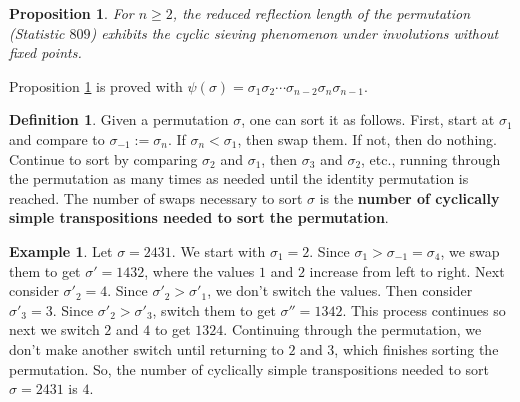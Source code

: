 \documentclass{amsart}
\newtheorem{prop}[thm]{Proposition}
\theoremstyle{definition}
\newtheorem{definition}[thm]{Definition}
\newtheorem{example}[thm]{Example}
\begin{document}
\begin{prop}\label{red_ref_len}
  For $n \geq 2$, the reduced reflection length of the permutation (Statistic $809$) exhibits the cyclic sieving phenomenon under involutions without fixed points.
\end{prop}


Proposition \ref{red_ref_len} is proved with $\psi(\sigma) = \sigma_1\sigma_2\dotsm \sigma_{n-2}\sigma_{n}\sigma_{n-1}$. 

\begin{definition}
  Given a permutation $\sigma$, one can sort it as follows. First, start at $\sigma_1$ and compare to $\sigma_{-1} := \sigma_n$. If $\sigma_n < \sigma_{1}$, then swap them. If not, then do nothing. Continue to sort by comparing $\sigma_2$ and $\sigma_1$, then $\sigma_3$ and $\sigma_2$, etc., running through the permutation as many times as needed until the identity permutation is reached. The number of swaps necessary to sort $\sigma$ is the \textbf{number of cyclically simple transpositions needed to sort the permutation}.
\end{definition}


\begin{example}
  Let $\sigma = 2 4 3 1$. We start with $\sigma_1 = 2$. Since $\sigma_1 > \sigma_{-1} = \sigma_4$, we swap them to get $\sigma' = 1 4 3 2$, where the values $1$ and $2$ increase from left to right. Next consider $\sigma'_2 = 4$. Since $\sigma'_2 > \sigma'_1$, we don't switch the values. Then consider $\sigma'_3 = 3$. Since $\sigma'_2 > \sigma'_3$, switch them to get $\sigma'' = 1 3 4 2$. This process continues so next we switch $2$ and $4$ to get $1 3 2 4$. Continuing through the permutation, we don't make another switch until returning to $2$ and $3$, which finishes sorting the permutation. So, the number of cyclically simple transpositions needed to sort $\sigma = 2 4 3 1$ is $4$.
\end{example}
\end{document}
